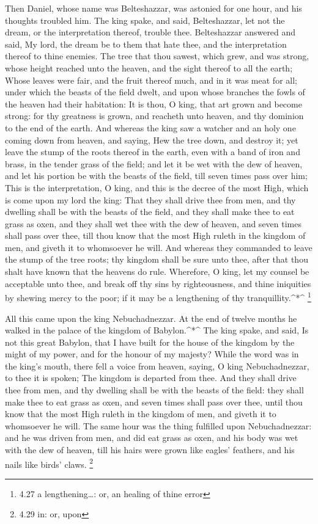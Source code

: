  Then Daniel, whose name was Belteshazzar, was astonied for
one hour, and his thoughts troubled him. The king spake, and said,
Belteshazzar, let not the dream, or the interpretation thereof, trouble
thee. Belteshazzar answered and said, My lord, the dream be to them that
hate thee, and the interpretation thereof to thine enemies.
 The tree that thou sawest, which grew, and was strong,
whose height reached unto the heaven, and the sight thereof to all the
earth;  Whose leaves were fair, and the fruit thereof much,
and in it was meat for all; under which the beasts of the field dwelt,
and upon whose branches the fowls of the heaven had their habitation:
 It is thou, O king, that art grown and become strong: for
thy greatness is grown, and reacheth unto heaven, and thy dominion to
the end of the earth.  And whereas the king saw a watcher
and an holy one coming down from heaven, and saying, Hew the tree down,
and destroy it; yet leave the stump of the roots thereof in the earth,
even with a band of iron and brass, in the tender grass of the field;
and let it be wet with the dew of heaven, and let his portion be with
the beasts of the field, till seven times pass over him; 
This is the interpretation, O king, and this is the decree of the most
High, which is come upon my lord the king:  That they shall
drive thee from men, and thy dwelling shall be with the beasts of the
field, and they shall make thee to eat grass as oxen, and they shall wet
thee with the dew of heaven, and seven times shall pass over thee, till
thou know that the most High ruleth in the kingdom of men, and giveth it
to whomsoever he will.  And whereas they commanded to leave
the stump of the tree roots; thy kingdom shall be sure unto thee, after
that thou shalt have known that the heavens do rule. 
Wherefore, O king, let my counsel be acceptable unto thee, and break off
thy sins by righteousness, and thine iniquities by shewing mercy to the
poor; if it may be a lengthening of thy tranquillity.\^{}*\^{}
\footnote{4.27 a lengthening\ldots: or, an healing of thine error}

 All this came upon the king Nebuchadnezzar. 
At the end of twelve months he walked in the palace of the kingdom of
Babylon.\^{}*\^{}  The king spake, and said, Is not this
great Babylon, that I have built for the house of the kingdom by the
might of my power, and for the honour of my majesty?  While
the word was in the king's mouth, there fell a voice from heaven,
saying, O king Nebuchadnezzar, to thee it is spoken; The kingdom is
departed from thee.  And they shall drive thee from men,
and thy dwelling shall be with the beasts of the field: they shall make
thee to eat grass as oxen, and seven times shall pass over thee, until
thou know that the most High ruleth in the kingdom of men, and giveth it
to whomsoever he will.  The same hour was the thing
fulfilled upon Nebuchadnezzar: and he was driven from men, and did eat
grass as oxen, and his body was wet with the dew of heaven, till his
hairs were grown like eagles' feathers, and his nails like birds' claws.
\footnote{4.29 in: or, upon}


